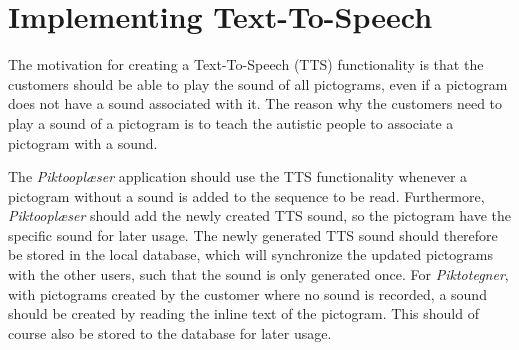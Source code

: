 \section{Implementing Text-To-Speech}
The motivation for creating a Text-To-Speech (TTS) functionality is that the customers should be able to play the sound of all pictograms, even if a pictogram does not have a sound associated with it.
The reason why the customers need to play a sound of a pictogram is to teach the autistic people to associate a pictogram with a sound.

The \textit{Piktooplæser} application should use the TTS functionality whenever a pictogram without a sound is added to the sequence to be read.
Furthermore, \textit{Piktooplæser} should add the newly created TTS sound, so the pictogram have the specific sound for later usage. The newly generated TTS sound should therefore be stored in the local database, which will synchronize the updated pictograms with the other users, such that the sound is only generated once.
For \textit{Piktotegner}, with pictograms created by the customer where no sound is recorded, a sound should be created by reading the inline text of the pictogram. This should of course also be stored to the database for later usage.